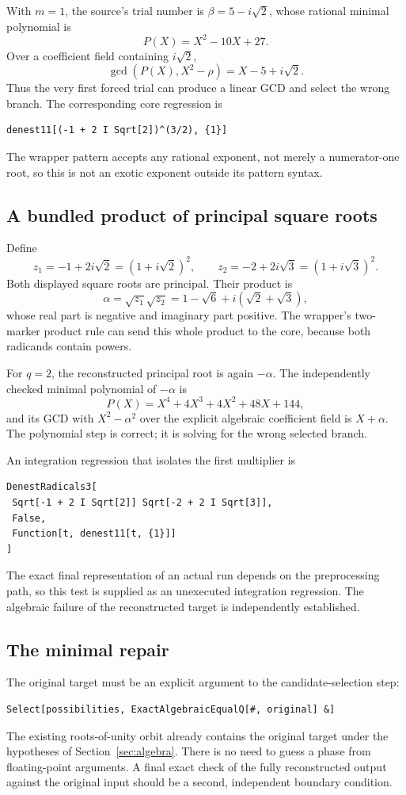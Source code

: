 \documentclass[11pt,letterpaper]{article}
\theoremstyle{definition}
\begin{document}
With $m=1$, the source's trial number is $\beta=5-i\sqrt2$, whose rational minimal
polynomial is
\[
 P(X)=X^2-10X+27.
\]
Over a coefficient field containing $i\sqrt2$,
\[
 \gcd(P(X),X^2-\rho)=X-5+i\sqrt2.
\]
Thus the very first forced trial can produce a linear GCD and select the wrong
branch. The corresponding core regression is
\begin{lstlisting}
denest11[(-1 + 2 I Sqrt[2])^(3/2), {1}]
\end{lstlisting}
The wrapper pattern accepts any rational exponent, not merely a numerator-one
root, so this is not an exotic exponent outside its pattern syntax.

\subsection{A bundled product of principal square roots}
Define
\[
 z_1=-1+2i\sqrt2=(1+i\sqrt2)^2,
 \qquad z_2=-2+2i\sqrt3=(1+i\sqrt3)^2.
\]
Both displayed square roots are principal. Their product is
\begin{equation}
 \alpha=\sqrt{z_1}\sqrt{z_2}
       =1-\sqrt6+i(\sqrt2+\sqrt3),
 \label{eq:product}
\end{equation}
whose real part is negative and imaginary part positive. The wrapper's two-marker
product rule can send this whole product to the core, because both radicands
contain powers.

For $q=2$, the reconstructed principal root is again $-\alpha$. The independently
checked minimal polynomial of $-\alpha$ is
\[
 P(X)=X^4+4X^3+4X^2+48X+144,
\]
and its GCD with $X^2-\alpha^2$ over the explicit algebraic coefficient field is
$X+\alpha$. The polynomial step is correct; it is solving for the wrong selected
branch.

An integration regression that isolates the first multiplier is
\begin{lstlisting}
DenestRadicals3[
 Sqrt[-1 + 2 I Sqrt[2]] Sqrt[-2 + 2 I Sqrt[3]],
 False,
 Function[t, denest11[t, {1}]]
]
\end{lstlisting}
The exact final representation of an actual run depends on the preprocessing
path, so this test is supplied as an unexecuted integration regression. The
algebraic failure of the reconstructed target is independently established.

\subsection{The minimal repair}
The original target must be an explicit argument to the candidate-selection step:
\begin{lstlisting}
Select[possibilities, ExactAlgebraicEqualQ[#, original] &]
\end{lstlisting}
The existing roots-of-unity orbit already contains the original target under the
hypotheses of Section~\ref{sec:algebra}. There is no need to guess a phase from
floating-point arguments. A final exact check of the fully reconstructed output
against the original input should be a second, independent boundary condition.
\end{document}

